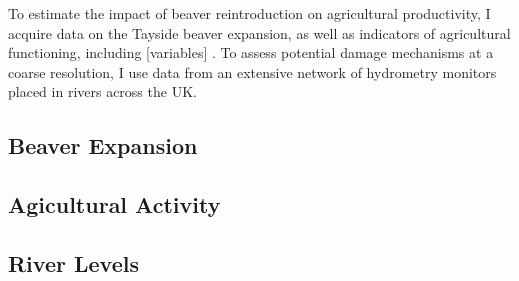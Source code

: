 To estimate the impact of beaver reintroduction on agricultural productivity, I acquire data on the Tayside beaver expansion, as well as indicators of agricultural functioning, including [variables] . To assess potential damage mechanisms at a coarse resolution, I use data from an extensive network of hydrometry monitors placed in rivers across the UK.

\subsection{Beaver Expansion}

\subsection{Agicultural Activity}

\subsection{River Levels}

